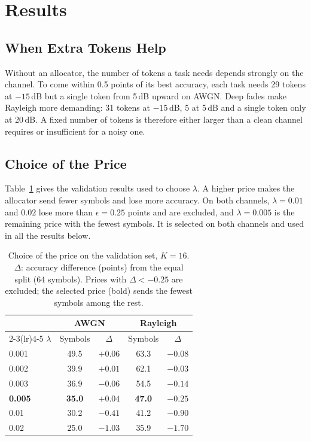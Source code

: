 \documentclass[conference]{IEEEtran}
\begin{document}
\section{Results}
\label{sec:results}

\subsection{When Extra Tokens Help}
\label{ssec:saturation}

Without an allocator, the number of tokens a task needs depends
strongly on the channel. To come within 0.5 points of its best
accuracy, each task needs 29 tokens at $-15$\,dB but a single token
from 5\,dB upward on AWGN. Deep fades make Rayleigh more demanding: 31
tokens at $-15$\,dB, 5 at 5\,dB and a single token only at 20\,dB. A
fixed number of tokens is therefore either larger than a clean channel
requires or insufficient for a noisy one.

\subsection{Choice of the Price}
\label{ssec:price}

Table~\ref{tab:price} gives the validation results used to choose
$\lambda$. A higher price makes the allocator send fewer symbols and
lose more accuracy. On both channels, $\lambda{=}0.01$ and $0.02$ lose
more than $\epsilon{=}0.25$ points and are excluded, and
$\lambda{=}0.005$ is the remaining price with the fewest symbols. It
is selected on both channels and used in all the results below.

\begin{table}[!t]
  \centering
  \caption{Choice of the price on the validation set, $K{=}16$.
           $\Delta$: accuracy difference (points) from the equal split
           (64 symbols). Prices with $\Delta < -0.25$ are excluded; the
           selected price (bold) sends the fewest symbols among the rest.}
  \label{tab:price}
  \footnotesize
  \setlength{\tabcolsep}{5pt}
  \begin{tabular}{lcccc}
    \toprule
    & \multicolumn{2}{c}{AWGN} & \multicolumn{2}{c}{Rayleigh} \\
    \cmidrule(lr){2-3}\cmidrule(lr){4-5}
    $\lambda$ & Symbols & $\Delta$ & Symbols & $\Delta$ \\
    \midrule
    0.001 & 49.5 & $+0.06$ & 63.3 & $-0.08$ \\
    0.002 & 39.9 & $+0.01$ & 62.1 & $-0.03$ \\
    0.003 & 36.9 & $-0.06$ & 54.5 & $-0.14$ \\
    \textbf{0.005} & \textbf{35.0} & $\mathbf{+0.04}$ & \textbf{47.0} & $\mathbf{-0.25}$ \\
    0.01  & 30.2 & $-0.41$ & 41.2 & $-0.90$ \\
    0.02  & 25.0 & $-1.03$ & 35.9 & $-1.70$ \\
    \bottomrule
  \end{tabular}
\end{table}
\end{document}
